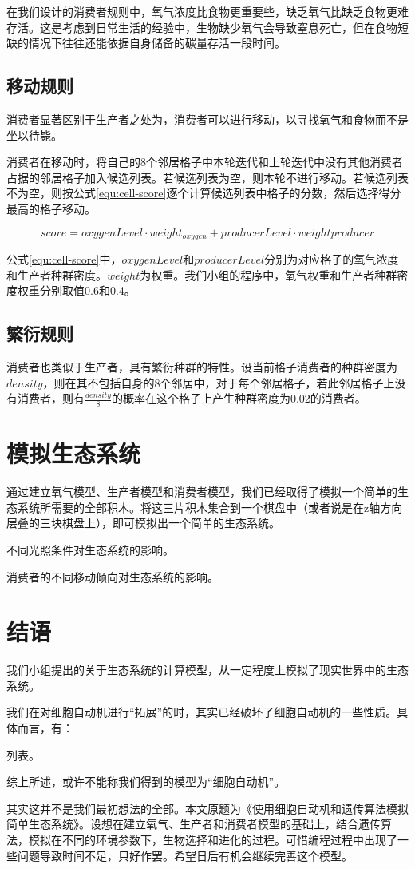 \documentclass{ctexart}
\begin{document}
在我们设计的消费者规则中，氧气浓度比食物更重要些，缺乏氧气比缺乏食物更难存活。这是考虑到日常生活的经验中，生物缺少氧气会导致窒息死亡，但在食物短缺的情况下往往还能依据自身储备的碳量存活一段时间。

\subsection{移动规则}

消费者显著区别于生产者之处为，消费者可以进行移动，以寻找氧气和食物而不是坐以待毙。

消费者在移动时，将自己的8个邻居格子中本轮迭代和上轮迭代中没有其他消费者占据的邻居格子加入候选列表。若候选列表为空，则本轮不进行移动。若候选列表不为空，则按公式\ref{equ:cell-score}逐个计算候选列表中格子的分数，然后选择得分最高的格子移动。

\begin{equation}
  \label{equ:cell-score}
  score = oxygenLevel \cdot weight_{oxygen} + producerLevel \cdot weight{producer}
\end{equation}

公式\ref{equ:cell-score}中，$oxygenLevel$和$producerLevel$分别为对应格子的氧气浓度和生产者种群密度。$weight$为权重。我们小组的程序中，氧气权重和生产者种群密度权重分别取值0.6和0.4。

\subsection{繁衍规则}

消费者也类似于生产者，具有繁衍种群的特性。设当前格子消费者的种群密度为$density$，则在其不包括自身的8个邻居中，对于每个邻居格子，若此邻居格子上没有消费者，则有$\frac{density}{8}$的概率在这个格子上产生种群密度为0.02的消费者。

\section{模拟生态系统}

通过建立氧气模型、生产者模型和消费者模型，我们已经取得了模拟一个简单的生态系统所需要的全部积木。将这三片积木集合到一个棋盘中（或者说是在z轴方向层叠的三块棋盘上），即可模拟出一个简单的生态系统。

不同光照条件对生态系统的影响。

消费者的不同移动倾向对生态系统的影响。

\section{结语}

我们小组提出的关于生态系统的计算模型，从一定程度上模拟了现实世界中的生态系统。

我们在对细胞自动机进行“拓展”的时，其实已经破坏了细胞自动机的一些性质。具体而言，有：

列表。

综上所述，或许不能称我们得到的模型为“细胞自动机”。

其实这并不是我们最初想法的全部。本文原题为《使用细胞自动机和遗传算法模拟简单生态系统》。设想在建立氧气、生产者和消费者模型的基础上，结合遗传算法，模拟在不同的环境参数下，生物选择和进化的过程。可惜编程过程中出现了一些问题导致时间不足，只好作罢。希望日后有机会继续完善这个模型。
\end{document}
